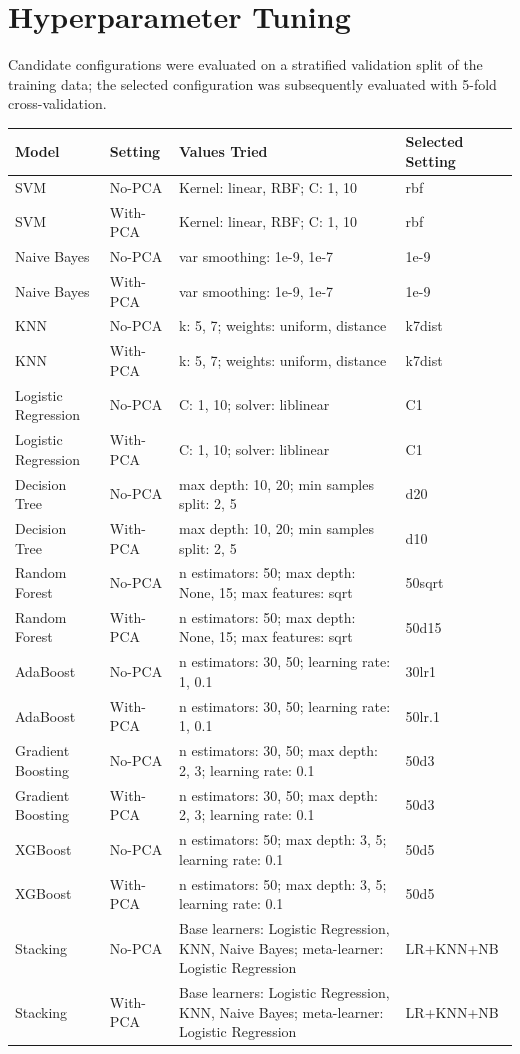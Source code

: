 \documentclass[12pt,a4paper]{article}
\begin{document}
\section{Hyperparameter Tuning} Candidate configurations were evaluated on a stratified validation split of the training data; the selected configuration was subsequently evaluated with 5-fold cross-validation.
\begin{longtable}{|p{2.3cm}|p{1.3cm}|p{6.2cm}|p{3cm}|}\hline Model & Setting & Values Tried & Selected Setting \\ \hline
SVM & No-PCA & Kernel: linear, RBF; C: 1, 10 & rbf \\
SVM & With-PCA & Kernel: linear, RBF; C: 1, 10 & rbf \\
Naive Bayes & No-PCA & var smoothing: 1e-9, 1e-7 & 1e-9 \\
Naive Bayes & With-PCA & var smoothing: 1e-9, 1e-7 & 1e-9 \\
KNN & No-PCA & k: 5, 7; weights: uniform, distance & k7dist \\
KNN & With-PCA & k: 5, 7; weights: uniform, distance & k7dist \\
Logistic Regression & No-PCA & C: 1, 10; solver: liblinear & C1 \\
Logistic Regression & With-PCA & C: 1, 10; solver: liblinear & C1 \\
Decision Tree & No-PCA & max depth: 10, 20; min samples split: 2, 5 & d20 \\
Decision Tree & With-PCA & max depth: 10, 20; min samples split: 2, 5 & d10 \\
Random Forest & No-PCA & n estimators: 50; max depth: None, 15; max features: sqrt & 50sqrt \\
Random Forest & With-PCA & n estimators: 50; max depth: None, 15; max features: sqrt & 50d15 \\
AdaBoost & No-PCA & n estimators: 30, 50; learning rate: 1, 0.1 & 30lr1 \\
AdaBoost & With-PCA & n estimators: 30, 50; learning rate: 1, 0.1 & 50lr.1 \\
Gradient Boosting & No-PCA & n estimators: 30, 50; max depth: 2, 3; learning rate: 0.1 & 50d3 \\
Gradient Boosting & With-PCA & n estimators: 30, 50; max depth: 2, 3; learning rate: 0.1 & 50d3 \\
XGBoost & No-PCA & n estimators: 50; max depth: 3, 5; learning rate: 0.1 & 50d5 \\
XGBoost & With-PCA & n estimators: 50; max depth: 3, 5; learning rate: 0.1 & 50d5 \\
Stacking & No-PCA & Base learners: Logistic Regression, KNN, Naive Bayes; meta-learner: Logistic Regression & LR+KNN+NB \\
Stacking & With-PCA & Base learners: Logistic Regression, KNN, Naive Bayes; meta-learner: Logistic Regression & LR+KNN+NB \\
\end{longtable}
\end{document}

